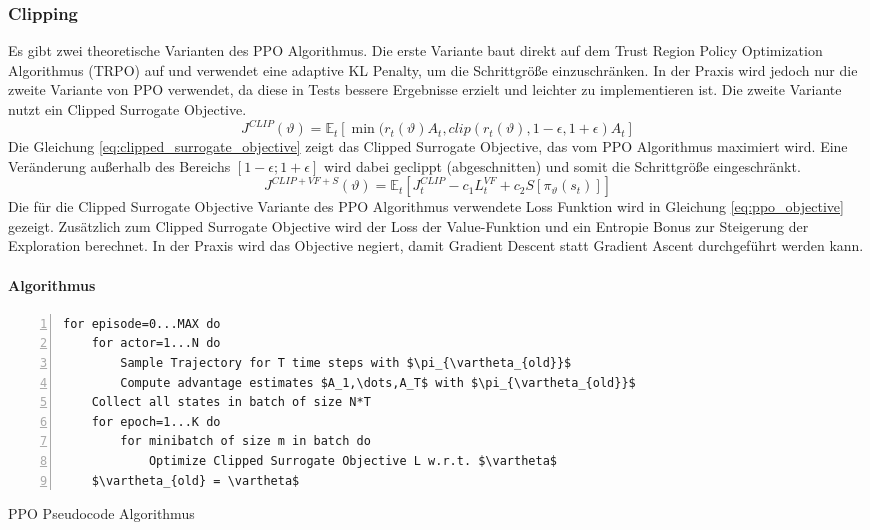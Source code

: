 \subsubsection{Clipping}
Es gibt zwei theoretische Varianten des PPO Algorithmus. Die erste Variante baut direkt auf dem Trust Region Policy Optimization Algorithmus (TRPO) \cite{trpoPaper} auf und verwendet eine adaptive KL Penalty, um die Schrittgröße einzuschränken. In der Praxis wird jedoch nur die zweite Variante von PPO verwendet, da diese in Tests bessere Ergebnisse erzielt und leichter zu implementieren ist.
Die zweite Variante nutzt ein Clipped Surrogate Objective.
\begin{equation}
    J^{CLIP}(\vartheta) = \mathbb{E}_t\left[ \min(r_t(\vartheta)A_t,clip(r_t(\vartheta),1-\epsilon,1+\epsilon)A_t \right]
    \label{eq:clipped_surrogate_objective}
\end{equation}
Die Gleichung \ref{eq:clipped_surrogate_objective} zeigt das Clipped Surrogate Objective, das vom PPO Algorithmus maximiert wird. Eine Veränderung außerhalb des Bereichs $[1-\epsilon; 1+\epsilon]$ wird dabei geclippt (abgeschnitten) und somit die Schrittgröße eingeschränkt.
\begin{equation}
    J^{CLIP+VF+S}(\vartheta) = \mathbb{E}_t \left[ J_t^{CLIP} - c_1L_t^{VF} + c_2S[\pi_\vartheta(s_t)] \right]
    \label{eq:ppo_objective}
\end{equation}
Die für die Clipped Surrogate Objective Variante des PPO Algorithmus verwendete Loss Funktion wird in Gleichung \ref{eq:ppo_objective} gezeigt. Zusätzlich zum Clipped Surrogate Objective wird der Loss der Value-Funktion und ein Entropie Bonus zur Steigerung der Exploration berechnet. In der Praxis wird das Objective negiert, damit Gradient Descent statt Gradient Ascent durchgeführt werden kann. \cite{PPOPaper}

\paragraph{Algorithmus}

\begin{algorithm}
\begin{lstlisting}[mathescape=true, numbers=left]
for episode=0...MAX do
    for actor=1...N do
        Sample Trajectory for T time steps with $\pi_{\vartheta_{old}}$
        Compute advantage estimates $A_1,\dots,A_T$ with $\pi_{\vartheta_{old}}$
    Collect all states in batch of size N*T
    for epoch=1...K do
        for minibatch of size m in batch do
            Optimize Clipped Surrogate Objective L w.r.t. $\vartheta$
    $\vartheta_{old} = \vartheta$
\end{lstlisting}
\caption{PPO Pseudocode Algorithmus \cite{FoundationsDeepRL}}
\label{alg:ppo}
\end{algorithm}

